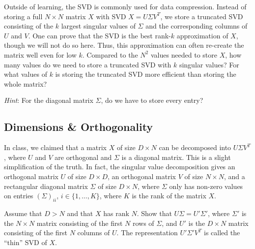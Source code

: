 \begin{solution}

\end{solution}

\problem[3] Outside of learning, the SVD is commonly used for data compression. Instead of storing a full $N \times N$ matrix $X$ with SVD $X = U\Sigma V^T$, we store a truncated SVD consisting of the $k$ largest singular values of $\Sigma$ and the corresponding columns of $U$ and $V$. One can prove that the SVD is the best rank-$k$ approximation of $X$, though we will not do so here. Thus, this approximation can often re-create the matrix well even for low $k$. Compared to the $N^2$ values needed to store $X$, how many values do we need to store a truncated SVD with $k$ singular values? For what values of $k$ is storing the truncated SVD more efficient than storing the whole matrix?

\textit{Hint}: For the diagonal matrix $\Sigma$, do we have to store every entry?

\begin{solution}

\end{solution}

\subsection{Dimensions \& Orthogonality} In class, we claimed that a matrix $X$ of size $D \times N$ can be decomposed into $U\Sigma V^T$, where $U$ and $V$ are orthogonal and $\Sigma$ is a diagonal matrix. This is a slight simplification of the truth. In fact, the singular value decomposition gives an orthogonal matrix $U$ of size $D \times D$, an orthogonal matrix $V$ of size $N \times N$, and a rectangular diagonal matrix $\Sigma$ of size $D \times N$, where $\Sigma$ only has non-zero values on entries $(\Sigma)_{ii}$, $i \in \{1, \ldots, K\}$, where $K$ is the rank of the matrix $X$. 

\problem[3] Assume that $D > N$ and that $X$ has rank $N$. Show that $U\Sigma = U'\Sigma'$, where $\Sigma'$ is the $N \times N$ matrix consisting of the first $N$ rows of $\Sigma$, and $U'$ is the $D \times N$ matrix consisting of the first $N$ columns of $U$. The representation $U'\Sigma' V^T$ is called the ``thin'' SVD of $X$.

\begin{solution}


\end{solution}

